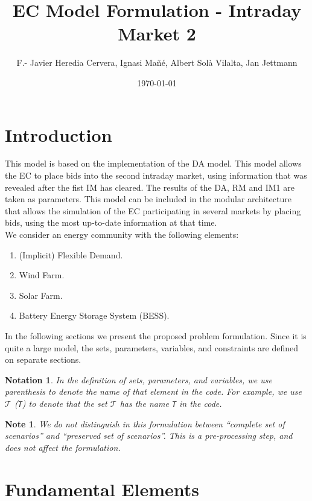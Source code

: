 \documentclass{article}
\title{EC Model Formulation - Intraday Market 2}
\author{F.- Javier Heredia Cervera, Ignasi Mañé, Albert Sol\`a Vilalta, Jan Jettmann}
\date{\today}
\newtheorem{notation}{Notation}[section]
\newtheorem{note}{Note}[section]
\begin{document}
\maketitle

\section{Introduction}
This model is based on the implementation of the DA model. This model allows the EC to place bids into the second intraday market, using information that was revealed after the fist IM has cleared. The results of the DA, RM and IM1 are taken as parameters. This model can be included in the modular architecture that allows the simulation of the EC participating in several markets by placing bids, using the most up-to-date information at that time.\\
We consider an energy community with the following elements:
\begin{enumerate}
	\item (Implicit) Flexible Demand.
	\item Wind Farm.
	\item Solar Farm.
	\item Battery Energy Storage System (BESS).
\end{enumerate}

In the following sections we present the proposed problem formulation. Since it is quite a large model, the sets, parameters, variables, and constraints are defined on separate sections.

\begin{notation}
	In the definition of sets, parameters, and variables, we use parenthesis to denote the name of that element in the code. For example, we use $\mathcal{T}$ (\verb|T|) to denote that the set $\mathcal{T}$ has the name \verb|T| in the code.  
\end{notation}

\begin{note} \label{NOTE:ScenarioTreatment}
	We do not distinguish in this formulation between ``complete set of scenarios'' and ``preserved set of scenarios''. This is a pre-processing step, and does not affect the formulation. 
\end{note}

\section{Fundamental Elements}
\label{SEC:FundamentalElements}
\end{document}
